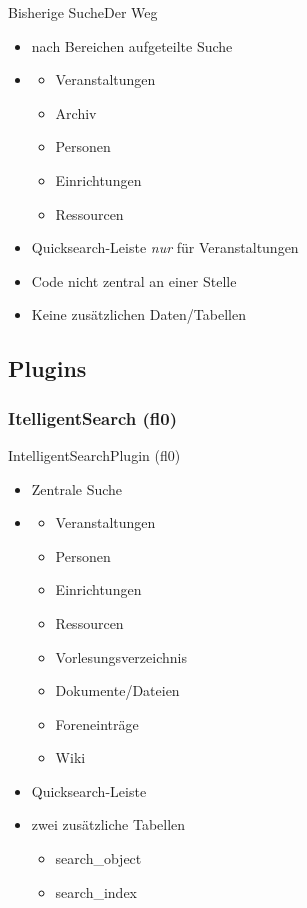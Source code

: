 \documentclass{beamer}
\begin{document}
\begin{frame}{Bisherige Suche}{Der Weg}
    \begin{itemize}
        \item {nach Bereichen aufgeteilte Suche\pause}
        \item[]{%
            \begin{itemize}
                \item{Veranstaltungen}
                \item{Archiv}
                \item{Personen}
                \item{Einrichtungen}
                \item{Ressourcen\pause}
            \end{itemize}
        }
    \item {Quicksearch-Leiste \textit{nur} für Veranstaltungen\pause}
    \item {Code nicht zentral an einer Stelle\pause}
    \item {Keine zusätzlichen Daten/Tabellen}
  \end{itemize}
\end{frame}


\subsection{Plugins}
\subsubsection{ItelligentSearch (fl0)}

\begin{frame}{IntelligentSearch}{Plugin (fl0)}
    \begin{itemize}
        \item {Zentrale Suche}
        \item[]{%
            \begin{itemize}
                \item{Veranstaltungen}
                \item{Personen}
                \item{Einrichtungen}
                \item{Ressourcen}
                \item{Vorlesungsverzeichnis}
                \item{Dokumente/Dateien}
                \item{Foreneinträge}
                \item{Wiki\pause}
            \end{itemize}
        }
    \item {Quicksearch-Leiste\pause}
    \item {zwei zusätzliche Tabellen}
    \begin{itemize}
        \item {search\_object}
        \item {search\_index}
    \end{itemize}
  \end{itemize}
\end{frame}
\end{document}
